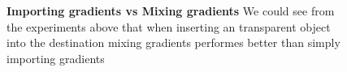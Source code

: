 \documentclass[11pt]{article}
\begin{document}
\begin{figure}[H]
{		}
		\caption{\textbf{Importing gradients vs Mixing gradients} We could see from the experiments above that when inserting an transparent object into the destination mixing gradients performes better than simply importing gradients}
	\end{figure}
\end{document}

